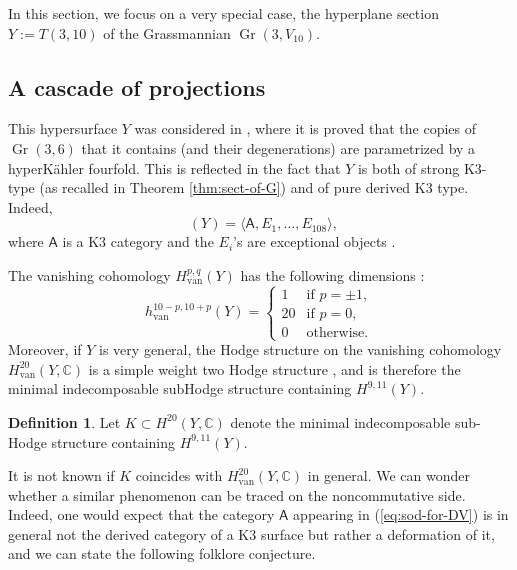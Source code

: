\documentclass[11pt]{article}
\newcommand{\van}{\mathrm{van}}
\theoremstyle{plain}
\theoremstyle{definition}
\newtheorem{defin}[theorem]{Definition}
\newcommand{\cat}[1]{\mathsf{#1}}
\newcommand{\sod}[1]{\langle #1 \rangle}
\DeclareMathOperator{\Db}{{\cat{D}^{\mathrm{b}}}}
\DeclareMathOperator{\Gr}{Gr}
\newcommand{\CC}{\mathbb{C}}
\begin{document}
In this section, we focus on a very special case, the hyperplane section $Y:=T(3,10)$ of
the Grassmannian $\Gr(3,V_{10})$.

\subsection{A cascade of projections}
This hypersurface $Y$ was considered in \cite{debarre-voisin}, where it is proved that the copies
of $\Gr(3,6)$ that it contains (and their degenerations) are parametrized by a hyperKähler fourfold.
This is reflected in the fact that $Y$ is both of strong
K3-type (as recalled in Theorem \ref{thm:sect-of-G}) and of pure derived K3 type. Indeed,\vspace*{-3pt}
\begin{equation}\label{eq:sod-for-DV}
\Db(Y)= \sod{\cat{A},E_1,\ldots,E_{108}},
\end{equation}
where $\cat{A}$ is a K3 category and the $E_i$'s are exceptional objects \cite{kuz-fractional}.

The vanishing cohomology $H^{p,q}_{\van}(Y)$
has the following dimensions \cite{debarre-voisin}:\vspace*{-3pt}\enlargethispage{.5\baselineskip}%
\begin{equation*}\label{eq:Hodge-for-DV}
h_{\van}^{10-p,10+p}(Y) = \begin{cases}
1 & \text{if } p=\pm 1, \\
20 & \text{if } p=0,\\
0 & \text{otherwise.}
\end{cases}
\end{equation*}
Moreover, if $Y$ is very general, the Hodge structure on the vanishing cohomology $H^{20}_{\van}(Y,\CC)$ is a simple weight two Hodge structure \cite[Th.\,2.2]{debarre-voisin},
and is therefore the minimal indecomposable subHodge structure containing $H^{9,11}(Y)$.

\begin{defin}
Let $K \subset H^{20}(Y,\CC)$ denote the minimal indecomposable sub-Hodge structure containing $H^{9,11}(Y)$.
\end{defin}

It is not known if $K$ coincides with $H^{20}_{\van}(Y,\CC)$ in general. We can wonder whether a similar
phenomenon can be traced on the noncommutative side. Indeed, one would expect that the category $\cat{A}$ appearing in (\ref{eq:sod-for-DV})
is in general not the derived category of a K3 surface but rather
a deformation of it, and we can state the following folklore conjecture.
\end{document}
